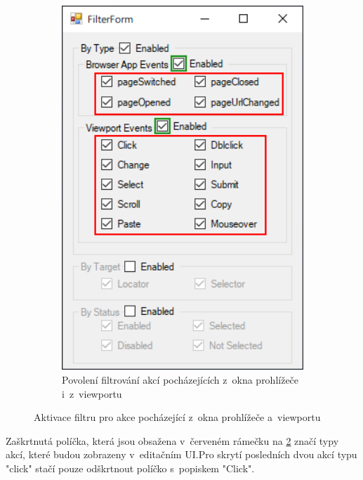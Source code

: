 \documentclass[12pt, a4paper, twoside]{article}
\begin{document}
\begin{figure}[H]
\begin{minipage}{0.47\textwidth}
\begin{subfigure}[t]{1.0\textwidth}
			\end{subfigure}	
		\end{minipage}
		\hfill
		\textrightarrow
		\hfill
		\begin{minipage}{0.47\textwidth}
			\begin{subfigure}[t]{1.0\textwidth}
				\includegraphics[width=1.0\textwidth, right]{filterForm3.png}
				\caption{Povolení filtrování akcí pocházejících z~okna prohlížeče i~z~viewportu}
				\label{subfig:filterEnableForAllTypes}
			\end{subfigure}	
		\end{minipage}
		\caption{Aktivace filtru pro akce pocházející z~okna prohlížeče a~viewportu}
	\end{figure}
	Zaškrtnutá políčka, která jsou obsažena v~červeném rámečku na \cref{subfig:filterEnableForAllTypes} značí typy akcí, které budou zobrazeny v~editačním UI.\newpage Pro skrytí posledních dvou akcí typu "click" stačí pouze odškrtnout políčko s~popiskem "Click".
\end{document}
